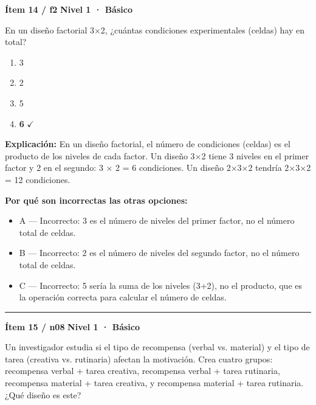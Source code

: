 \documentclass[12pt,a4paper]{article}
\begin{document}
\begin{mdframed}[backgroundcolor=fondogris,linecolor=azul,linewidth=1pt,innerleftmargin=10pt,innerrightmargin=10pt,innertopmargin=7pt,innerbottommargin=7pt]
\textbf{Ítem 14 / f2} \hfill {\small\bfseries\color{azul} Nivel 1 · Básico}
\end{mdframed}

En un diseño factorial 3×2, ¿cuántas condiciones experimentales (celdas) hay en total?

\begin{enumerate}
  \item[A.] 3
  \item[B.] 2
  \item[C.] 5
  \item[\textbf{\color{verde}D.}] \textbf{\color{verde} 6} \hfill $\checkmark$
\end{enumerate}

\noindent\textbf{\color{azul}Explicación:} En un diseño factorial, el número de condiciones (celdas) es el producto de los niveles de cada factor. Un diseño 3×2 tiene 3 niveles en el primer factor y 2 en el segundo: 3 × 2 = 6 condiciones. Un diseño 2×3×2 tendría 2×3×2 = 12 condiciones.

\noindent\textbf{\color{gris}Por qué son incorrectas las otras opciones:}
\begin{itemize}
  \item {\small A — Incorrecto: 3 es el número de niveles del primer factor, no el número total de celdas.}
  \item {\small B — Incorrecto: 2 es el número de niveles del segundo factor, no el número total de celdas.}
  \item {\small C — Incorrecto: 5 sería la suma de los niveles (3+2), no el producto, que es la operación correcta para calcular el número de celdas.}
\end{itemize}
\vspace{8pt}\hrule\vspace{10pt}

\begin{mdframed}[backgroundcolor=fondogris,linecolor=azul,linewidth=1pt,innerleftmargin=10pt,innerrightmargin=10pt,innertopmargin=7pt,innerbottommargin=7pt]
\textbf{Ítem 15 / n08} \hfill {\small\bfseries\color{azul} Nivel 1 · Básico}
\end{mdframed}

Un investigador estudia si el tipo de recompensa (verbal vs. material) y el tipo de tarea (creativa vs. rutinaria) afectan la motivación. Crea cuatro grupos: recompensa verbal + tarea creativa, recompensa verbal + tarea rutinaria, recompensa material + tarea creativa, y recompensa material + tarea rutinaria. ¿Qué diseño es este?
\end{document}
